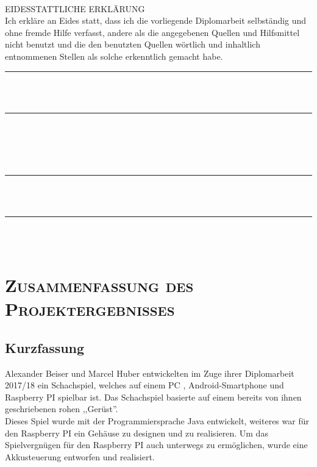 \documentclass[12pt,a4paper]{article}
\begin{document}
	\hfill\\[ 8mm]
	EIDESSTATTLICHE ERKLÄRUNG
	\\[3mm]
	\noindent%
	Ich erkläre an Eides statt, dass ich die vorliegende Diplomarbeit selbständig und
	ohne fremde Hilfe verfasst, andere als die angegebenen Quellen und Hilfsmittel
	nicht benutzt und die den benutzten Quellen wörtlich und inhaltlich entnommenen
	Stellen als solche erkenntlich gemacht habe.
	\\[12mm]
	\parbox[b]{52mm}{
		\rule{50mm}{0.2pt}\rule{0pt}{25mm}
		\\\hspace*{6mm}{Ort, Datum}
		\\[0mm]
	}
	\hfill
	\parbox[b]{72mm}{
		\rule{70mm}{0.2pt}\rule{0pt}{25mm}
		\\\hspace*{6mm}{Verfasser, Verfasserinnen}
		\\\hspace*{6mm}{Vor- und Zunamen}
	}
		\\[12mm]
	\parbox[b]{52mm}{
		\rule{50mm}{0.2pt}\rule{0pt}{25mm}
		\\\hspace*{6mm}{Ort, Datum}
		\\[0mm]
	}
	\hfill
	\parbox[b]{72mm}{
		\rule{70mm}{0.2pt}\rule{0pt}{25mm}
		\\\hspace*{6mm}{Verfasser, Verfasserinnen}
		\\\hspace*{6mm}{Vor- und Zunamen}
	}






\newpage
\section{\scshape Zusammenfassung des Projektergebnisses}
 \subsection{Kurzfassung}
 
	Alexander Beiser und Marcel Huber entwickelten im Zuge ihrer Diplomarbeit 2017/18 ein Schachspiel, welches auf einem \ac{PC} , Android-Smartphone und Raspberry PI spielbar ist. Das Schachspiel basierte auf einem bereits von ihnen geschriebenen rohen ,,Gerüst''. \\
	Dieses Spiel wurde mit der Programmiersprache Java entwickelt, weiteres war für den Raspberry PI ein Gehäuse zu designen und zu realisieren. Um das Spielvergnügen für den Raspberry PI auch unterwegs zu ermöglichen, wurde eine Akkusteuerung entworfen und realisiert. \\
\end{document}
